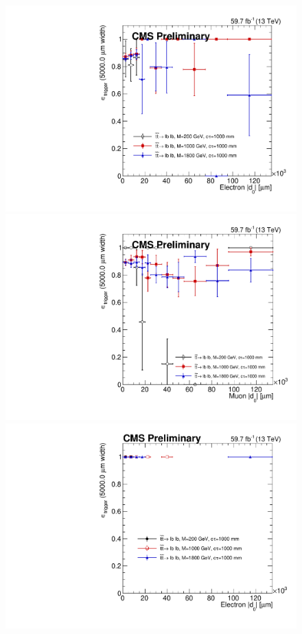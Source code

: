\begin{figure}[hbtp]
\centering
\includegraphics[scale=0.3]{figures/systematics/trig_eff/emu_2018/electronAbsD0_100000um_variableBins_coarse.pdf}
\includegraphics[scale=0.3]{figures/systematics/trig_eff/emu_2018/muonAbsD0_100000um_variableBins_coarse.pdf}
\includegraphics[scale=0.3]{figures/systematics/trig_eff/ee_2018/electronAbsD0_100000um_variableBins_coarse.pdf}

\end{figure}
